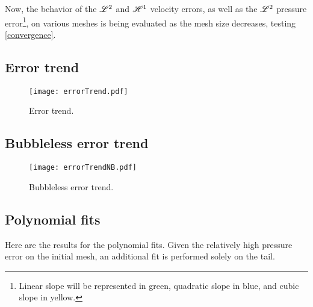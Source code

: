 Now, the behavior of the $\mathscr{L}^2$ and $\mathscr{H}^1$ velocity errors, as well as the $\mathscr{L}^2$ pressure error\footnote{Linear slope will be represented in \textcolor{solarized-green}{green}, quadratic slope in \textcolor{solarized-blue}{blue}, and cubic slope in \textcolor{solarized-yellow}{yellow}.}, on various meshes is being evaluated as the mesh size decreases, testing \ref{convergence}.


\subsection{Error trend}

\begin{figure}[!ht]
	\centering
	\texttt{[image: errorTrend.pdf]}
	\caption{Error trend.}
\end{figure}

\newpage
\subsection{Bubbleless error trend}

\begin{figure}[!ht]
	\centering
	\texttt{[image: errorTrendNB.pdf]}
	\caption{Bubbleless error trend.}
\end{figure}

\newpage
\subsection{Polynomial fits}

Here are the results for the polynomial fits. Given the relatively high pressure error on the initial mesh, an additional fit is performed solely on the tail. 



